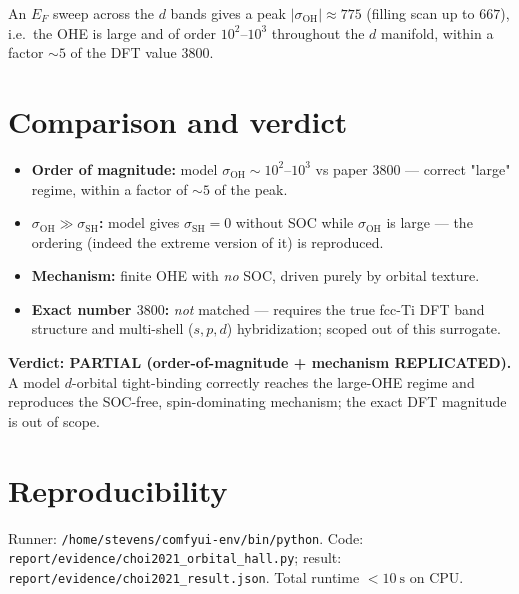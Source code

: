 \documentclass[11pt]{article}
\begin{document}
An $E_F$ sweep across the $d$ bands gives a peak $|\sigma_{\mathrm{OH}}|\approx 775$
(filling scan up to $667$), i.e.\ the OHE is large and of order $10^2$--$10^3$ throughout the
$d$ manifold, within a factor $\sim5$ of the DFT value $3800$.

\section{Comparison and verdict}
\begin{itemize}
\item \textbf{Order of magnitude:} model $\sigma_{\mathrm{OH}}\sim10^2$--$10^3$ vs paper $3800$
      --- correct "large" regime, within a factor of $\sim5$ of the peak. \checkmark
\item \textbf{$\sigma_{\mathrm{OH}}\gg\sigma_{\mathrm{SH}}$:} model gives $\sigma_{\mathrm{SH}}=0$
      without SOC while $\sigma_{\mathrm{OH}}$ is large --- the ordering (indeed the extreme
      version of it) is reproduced. \checkmark
\item \textbf{Mechanism:} finite OHE with \emph{no} SOC, driven purely by orbital texture. \checkmark
\item \textbf{Exact number $3800$:} \emph{not} matched --- requires the true fcc-Ti DFT band
      structure and multi-shell ($s,p,d$) hybridization; scoped out of this surrogate.
\end{itemize}
\textbf{Verdict: PARTIAL (order-of-magnitude + mechanism REPLICATED).}
A model $d$-orbital tight-binding correctly reaches the large-OHE regime and reproduces the
SOC-free, spin-dominating mechanism; the exact DFT magnitude is out of scope.

\section{Reproducibility}
Runner: \texttt{/home/stevens/comfyui-env/bin/python}. Code:
\texttt{report/evidence/choi2021\_orbital\_hall.py}; result:
\texttt{report/evidence/choi2021\_result.json}. Total runtime $<\SI{10}{\second}$ on CPU.
\end{document}
